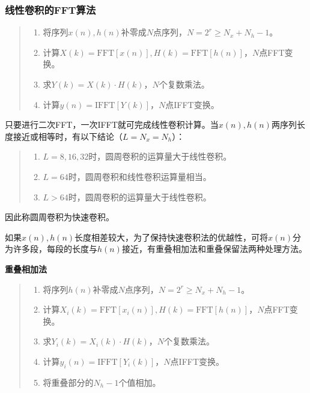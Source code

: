 \documentclass[cn, hazy, blue, normal, 14pt]{elegantnote}
\begin{document}
\subsubsection{线性卷积的FFT算法}

\begin{quote}
\begin{enumerate}
    \item 将序列$x(n), h(n)$补零成$N$点序列，$N=2^r\geq N_x+N_h-1$。
    \item 计算$X(k)=\text{FFT}[x(n)], H(k)=\text{FFT}[h(n)]$，$N$点FFT变换。
    \item 求$Y(k)=X(k)\cdot H(k)$，$N$个复数乘法。
    \item 计算$y(n)=\text{IFFT}[Y(k)]$，$N$点IFFT变换。
\end{enumerate}
\end{quote}

只要进行二次FFT，一次IFFT就可完成线性卷积计算。当$x(n), h(n)$两序列长度接近或相等时，有以下结论（$L=N_x=N_h$）：

\begin{quote}
\begin{enumerate}
    \item $L=8, 16, 32$时，圆周卷积的运算量大于线性卷积。
    \item $L=64$时，圆周卷积和线性卷积运算量相当。
    \item $L>64$时，圆周卷积的运算量大于线性卷积。
\end{enumerate}
\end{quote}

因此称圆周卷积为快速卷积。

如果$x(n), h(n)$长度相差较大，为了保持快速卷积法的优越性，可将$x(n)$分为许多段，每段的长度与$h(n)$接近，有重叠相加法和重叠保留法两种处理方法。

\textbf{重叠相加法}

\begin{quote}
\begin{enumerate}
    \item 将序列$h(n)$补零成$N$点序列，$N=2^r\geq N_x+N_h-1$。
    \item 计算$X_i(k)=\text{FFT}[x_i(n)], H(k)=\text{FFT}[h(n)]$，$N$点FFT变换。
    \item 求$Y_i(k)=X_i(k)\cdot H(k)$，$N$个复数乘法。
    \item 计算$y_i(n)=\text{IFFT}[Y_i(k)]$，$N$点IFFT变换。
    \item 将重叠部分的$N_h-1$个值相加。
\end{enumerate}
\end{quote}
\end{document}
